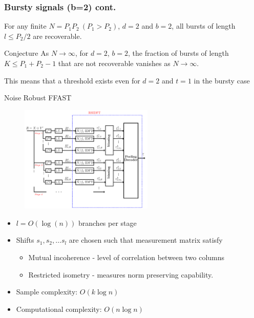 \documentclass[10pt,xcolor=table]{beamer}
\begin{document}
	\begin{frame} \frametitle{Bursty signals (b=2) cont.}
		
		\begin{theorem}
			\color{blue} For any finite $N = P_1 P_2 \ (P_1 > P_2)$, $d=2$ and $b=2$, all bursts of length $l \leq P_2/2$ are recoverable.
		\end{theorem}
		
		\begin{block}{Conjecture}
			\color{blue} As $N \rightarrow \infty$, for $d=2$, $b=2$, the fraction of bursts of length $K \leq P_1+P_2-1$ that are not recoverable vanishes as $N \rightarrow \infty$.
		\end{block}
		
		\pause
		\begin{block}{}
			This means that a threshold exists even for $d=2$ and $t=1$ in the bursty case
		\end{block}
	\end{frame}
	\begin{frame}{Noise Robust FFAST}
		\begin{figure}[t]
			\centering
			\includegraphics[width=2.5in]{./Figures/FFAST_Robust}
		\end{figure}
		\vspace{-0.4cm}
		\begin{block}{}
			\begin{itemize}
				\item $l = O(\log(n))$ branches per stage 
				\item Shifts $s_1, s_2, \ldots s_l$ are chosen such that measurement matrix satisfy
				    \begin{itemize}
				    	\item {\color{blue}Mutual incoherence} - level of correlation between two columns
				    	\item {\color{blue}Restricted isometry} - measures norm preserving capability.
				    \end{itemize}
				 	    \item Sample complexity: {\color{blue} $O(k \log n)$}
				 	    \item Computational complexity: {\color{blue} $ O(n \log n)$}
				   
				     
			\end{itemize}
		\end{block}
	\end{frame}
\end{document}
